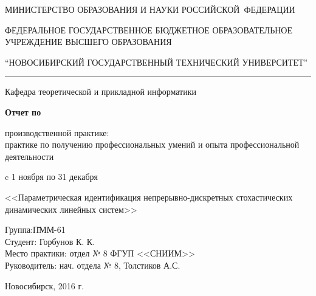 \documentclass[a4paper,14pt]{extarticle}
\begin{document}
\begin{titlepage}

	\begin{center}
		\MakeTextUppercase{Министерство образования и науки Российской~Федерации}

		\bigbreak

		ФЕДЕРАЛЬНОЕ ГОСУДАРСТВЕННОЕ БЮДЖЕТНОЕ ОБРАЗОВАТЕЛЬНОЕ УЧРЕЖДЕНИЕ
			ВЫСШЕГО ОБРАЗОВАНИЯ

		\bigbreak

		\MakeTextUppercase{\enquote{Новосибирский государственный технический
			университет}}
		\vspace{5pt}
		\hrule

		\bigbreak

		Кафедра теоретической и прикладной информатики

		\vspace{50pt}

		\textbf{\LARGE{Отчет по}\\}

		\bigbreak

		производственной практике: \\
			практике по получению профессиональных умений и опыта профессиональной
			деятельности

		\bigbreak

		c 1 ноября по 31 декабря

		\bigbreak

		<<Параметрическая идентификация непрерывно-дискретных стохастических
		динамических линейных систем>>

		\vspace{50pt}

	\end{center}

	\begin{flushleft}
		\begin{tabbing}
			Группа:\qquad\qquad\qquad \= ПММ-61\\
			Студент:                  \> Горбунов К. К.\\
			Место практики:           \> отдел № 8 ФГУП <<СНИИМ>> \\
			Руководитель:             \> нач. отдела № 8, Толстиков А.С.
		\end{tabbing}
	\end{flushleft}

	\begin{center}
		\vspace{\fill}
		Новосибирск, 2016 г.
	\end{center}

\end{titlepage}
\end{document}
